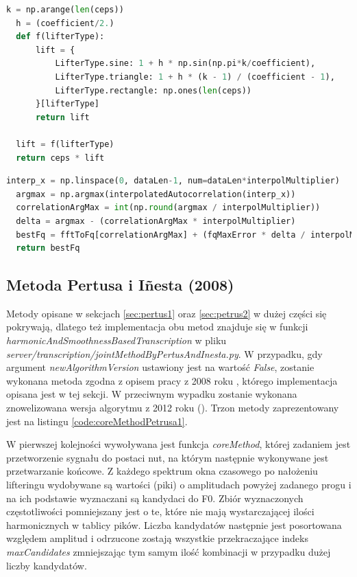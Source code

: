 \documentclass[12pt,a4paper,twoside]{mwart}
\begin{document}
\begin{lstlisting}[float, language=Python, caption={Filtrowanie w domenie quefrency}, captionpos=b, label={code:liftering}]
  k = np.arange(len(ceps))
  h = (coefficient/2.)
  def f(lifterType):
      lift = {
          LifterType.sine: 1 + h * np.sin(np.pi*k/coefficient),
          LifterType.triangle: 1 + h * (k - 1) / (coefficient - 1),
          LifterType.rectangle: np.ones(len(ceps))
      }[lifterType]
      return lift

  lift = f(lifterType)
  return ceps * lift
\end{lstlisting}

\begin{lstlisting}[float, language=Python, caption={Wyznaczanie F0 w ACLOS}, captionpos=b, label={code:bestFqInterpolate}]
  interp_x = np.linspace(0, dataLen-1, num=dataLen*interpolMultiplier)
  argmax = np.argmax(interpolatedAutocorrelation(interp_x))
  correlationArgMax = int(np.round(argmax / interpolMultiplier))
  delta = argmax - (correlationArgMax * interpolMultiplier)
  bestFq = fftToFq[correlationArgMax] + (fqMaxError * delta / interpolMultiplier)
  return bestFq
\end{lstlisting}

\subsection{Metoda Pertusa i Iñesta (2008)}\label{sec:impl:alg:specSmoothnes}
Metody opisane w sekcjach \ref{sec:pertus1} oraz \ref{sec:petrus2} w dużej części się pokrywają, dlatego też implementacja obu metod znajduje się w funkcji \textit{harmonicAndSmoothnessBasedTranscription} w pliku \textit{server/transcription/jointMethodByPertusAndInesta.py}. W przypadku, gdy argument \textit{newAlgorithmVersion} ustawiony jest na wartość \textit{False}, zostanie wykonana metoda zgodna z opisem pracy z 2008 roku \cite{Transcription:Pertus:Inharmonicity}, którego implementacja opisana jest w tej sekcji. W przeciwnym wypadku zostanie wykonana znowelizowana wersja algorytmu z 2012 roku (\cite{Transcription:Pertus:Inharmonicity2}). Trzon metody zaprezentowany jest na listingu \ref{code:coreMethodPetrusa1}.

W pierwszej kolejności wywoływana jest funkcja \textit{coreMethod}, której zadaniem jest przetworzenie sygnału do postaci nut, na którym następnie wykonywane jest przetwarzanie końcowe. Z każdego spektrum okna czasowego po nałożeniu lifteringu wydobywane są wartości (piki) o amplitudach powyżej zadanego progu i na ich podstawie wyznaczani są kandydaci do F0. Zbiór wyznaczonych częstotliwości pomniejszany jest o te, które nie mają wystarczającej ilości harmonicznych w tablicy pików. Liczba kandydatów następnie jest posortowana względem amplitud i odrzucone zostają wszystkie przekraczające indeks \textit{maxCandidates} zmniejszając tym samym ilość kombinacji w przypadku dużej liczby kandydatów.
\end{document}
